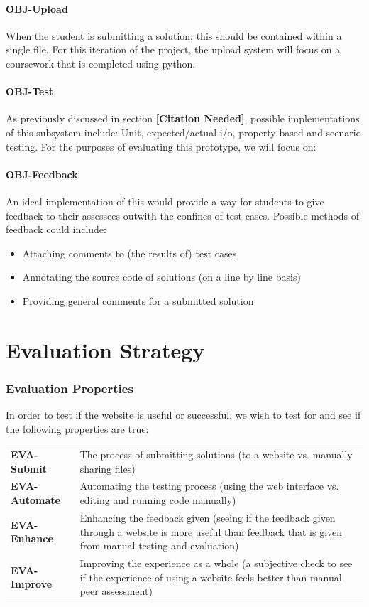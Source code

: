 \documentclass[a4paper,11pt]{report}
\newcommand{\cn}{\textbf{[Citation Needed]}}
\begin{document}
\subsubsection*{OBJ-Upload}
When the student is submitting a solution, this should be contained within a single file. For this iteration of the project, the upload system will focus on a coursework that is completed using python.
\subsubsection*{OBJ-Test}
As previously discussed in section \cn, possible implementations of this subsystem include: Unit, expected/actual i/o, property based and scenario testing. For the purposes of evaluating this prototype, we will focus on:
\subsubsection*{OBJ-Feedback}
An ideal implementation of this would provide a way for students to give feedback to their assessees outwith the confines of test cases. Possible methods of feedback could include:
\begin{itemize}
 \item Attaching comments to (the results of) test cases
 \item Annotating the source code of solutions (on a line by line basis)
 \item Providing general comments for a submitted solution
\end{itemize}


\chapter{Evaluation Strategy}

\subsection{Evaluation Properties}
In order to test if the website is useful or successful, we wish to test for and see if the following properties are true:\\
\begin{tabularx}{\textwidth}{lX}
 \textbf{EVA-Submit} & The process of submitting solutions (to a website vs. manually sharing files)\\
 \textbf{EVA-Automate} & Automating the testing process (using the web interface vs. editing and running code manually)\\
 \textbf{EVA-Enhance} & Enhancing the feedback given (seeing if the feedback given through a website is more useful than feedback that is given from manual testing and evaluation)\\
 \textbf{EVA-Improve} & Improving the experience as a whole (a subjective check to see if the experience of using a website feels better than manual peer assessment)\\
\end{tabularx}
\end{document}
